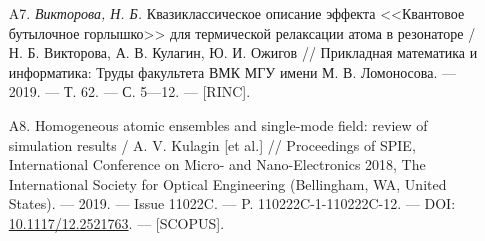 {\begin{itemize}[leftmargin=24pt]
	\item[A7.]{\textit{Викторова, Н. Б.} Квазиклассическое описание эффекта <<Квантовое бутылочное горлышко>> для термической релаксации атома в резона­торе / Н. Б. Викторова, А. В. Кулагин, Ю. И. Ожигов // Прикладная математика и информатика: Труды факультета ВМК МГУ имени М. В. Ломоносова. — 2019. — Т. 62. — С. 5—12. — [RINC].}
	\item[A8.]{Homogeneous atomic ensembles and single-mode field: review of simulation results / A. V. Kulagin [et al.] // Proceedings of SPIE, International Conference on Micro- and Nano-Electronics 2018, The International Society for Optical Engineering (Bellingham, WA, United States). — 2019. — Issue 11022C. — P. 110222C-1-110222C-12. — DOI: \href{http://dx.doi.org/10.1117/12.2521763}{10.1117/12.2521763}. — [SCOPUS].}
\end{itemize}
}
